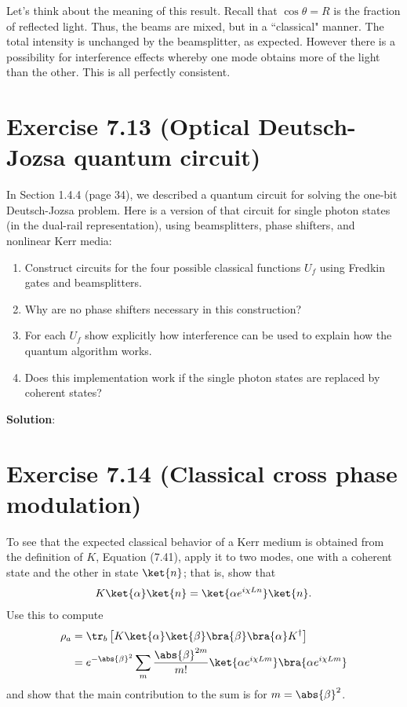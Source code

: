 \documentclass{book}
\begin{document}
    Let's think about the meaning of this result. Recall that $\cos\theta = R$ is the fraction of reflected light. Thus, the beams are mixed, but in a ``classical" manner. The total intensity is unchanged by the beamsplitter, as expected. However there is a possibility for interference effects whereby one mode obtains more of the light than the other. This is all perfectly consistent. 

\section*{Exercise 7.13 (Optical Deutsch-Jozsa quantum circuit)}
    In Section 1.4.4 (page 34), we described a quantum circuit for solving the one-bit Deutsch-Jozsa problem. Here is a version of that circuit for single photon states (in the dual-rail representation), using beamsplitters, phase shifters, and nonlinear Kerr media:

    \begin{enumerate}
        \item Construct circuits for the four possible classical functions $U_f$ using Fredkin gates and beamsplitters.
        \item Why are no phase shifters necessary in this construction?
        \item For each $U_f$ show explicitly how interference can be used to explain how the quantum algorithm works.
        \item Does this implementation work if the single photon states are replaced by coherent states?
    \end{enumerate}

    \textbf{Solution}:

\section*{Exercise 7.14 (Classical cross phase modulation)}
    To see that the expected classical behavior of a Kerr medium is obtained from the definition of $K$, Equation (7.41), apply it to two modes, one with a coherent state and the other in state $\ket{n}$; that is, show that
    \begin{align}
        K\ket{\alpha}\ket{n} = \ket{\alpha e^{i\chi L n}} \ket{n}.
    \end{align}
    Use this to compute
    \begin{align}
        \rho_a &= \tr_b \left[K\ket{\alpha}\ket{\beta}\bra{\beta}\bra{\alpha}K^\dagger\right] \\
        &= e^{-\abs{\beta}^2} \sum_{m} \frac{\abs{\beta}^{2m}}{m!} \ket{\alpha e^{i\chi Lm}}\bra{\alpha e^{i\chi Lm}}
    \end{align}
    and show that the main contribution to the sum is for $m = \abs{\beta}^2$.
\end{document}
